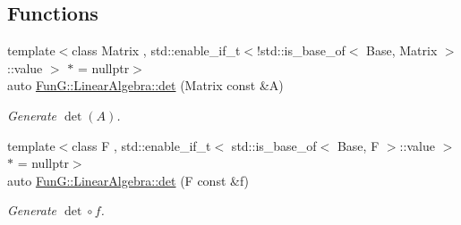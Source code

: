 \subsection*{Functions}
\begin{DoxyCompactItemize}
\item 
{\footnotesize template$<$class Matrix , std\+::enable\+\_\+if\+\_\+t$<$!std\+::is\+\_\+base\+\_\+of$<$ Base, Matrix $>$\+::value $>$ $\ast$  = nullptr$>$ }\\auto \hyperlink{group__LinearAlgebraGroup_gadb3017b4b2828e25a0784b10396a836f}{Fun\+G\+::\+Linear\+Algebra\+::det} (Matrix const \&A)
\begin{DoxyCompactList}\small\item\em Generate $\det(A)$. \end{DoxyCompactList}\item 
{\footnotesize template$<$class F , std\+::enable\+\_\+if\+\_\+t$<$ std\+::is\+\_\+base\+\_\+of$<$ Base, F $>$\+::value $>$ $\ast$  = nullptr$>$ }\\auto \hyperlink{group__LinearAlgebraGroup_ga552048de67f3412ae0a220b3123db6e5}{Fun\+G\+::\+Linear\+Algebra\+::det} (F const \&f)
\begin{DoxyCompactList}\small\item\em Generate $\det\circ f$. \end{DoxyCompactList}\end{DoxyCompactItemize}
